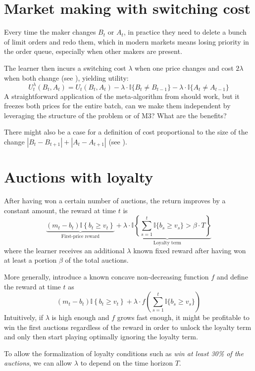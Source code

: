 \documentclass[a4paper,11pt]{article}
\newcommand{\lrb}[1]{\left(#1\right)}
\newcommand{\lcb}[1]{\left\{#1\right\}}
\newcommand{\I}[1]{\mathbb{I}\lcb{#1}}
\begin{document}
\section{Market making with switching cost}
Every time the maker changes $B_t$ or $A_t$, in practice they need to delete a bunch of limit orders and redo them, which in modern markets means losing priority in the order queue, especially when other makers are present.

The learner then incurs a switching cost $\lambda$ when one price changes and cost $2 \lambda$ when both change (see \cite{rouyer_algorithm_2021}), yielding utility:
\[
    U^\lambda_t(B_t, A_t) =
    U_t(B_t, A_t)
    - \lambda \cdot \mathbb{I}\{ B_t \neq B_{t-1}\}
    - \lambda \cdot \mathbb{I}\{ A_t \neq A_{t-1} \}
\]
A straightforward application of the meta-algorithm from \cite{rouyer_algorithm_2021} should work, but it freezes both prices for the entire batch, can we make them independent by leveraging the structure of the problem or of M3? What are the benefits?

There might also be a case for a definition of cost proportional to the size of the change $|B_t - B_{t+1}| + |A_t - A_{t+1}|$ (see \cite{koren_multi-armed_2017}).

\section{Auctions with loyalty}\label{sec:loyalty}
After having won a certain number of auctions, the return improves by a constant amount, the reward at time $t$ is
\[
    \underbrace{(m_t - b_t) \I{b_t \ge v_t}}_{\text{First-price reward}}
    + \underbrace{\lambda \cdot \I{\sum_{s=1}^{t} \mathbb{I}\{ b_s \ge v_s \} > \beta \cdot T}}_{\text{Loyalty term}}
\]
where the learner receives an additional $\lambda$ known fixed reward after having won at least a portion $\beta$ of the total auctions.

More generally, introduce a known concave non-decreasing function $f$ and define the reward at time $t$ as 
\[
    (m_t - b_t) \I{b_t \ge v_t}
    + \lambda \cdot f\lrb{\sum_{s=1}^{t} \mathbb{I}\{ b_s \ge v_s \}}
\]
Intuitively, if $\lambda$ is high enough and $f$ grows fast enough, it might be profitable to win the first auctions regardless of the reward in order to unlock the loyalty term and only then start playing optimally ignoring the loyalty term.

To allow the formalization of loyalty conditions such as \textit{win at least 30\% of the auctions}, we can allow $\lambda$ to depend on the time horizon $T$.
\end{document}
